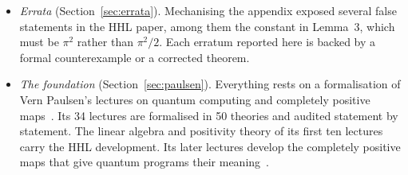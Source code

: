 \documentclass[runningheads]{llncs}
\let\ket\relax\let\bra\relax\let\braket\relax\let\ketbra\relax
\newcommand{\ket}[1]{|#1\rangle}
\newcommand{\bra}[1]{\langle #1|}
\newcommand{\braket}[2]{\langle #1|#2\rangle}
\newcommand{\ketbra}[2]{|#1\rangle\langle #2|}
\begin{document}
\begin{itemize}
transform; the controlled rotation, as a uniformly controlled rotation with Walsh--Hadamard angles; the
preparation of the clock and of an arbitrary $\ket b$; and, for $s$-sparse $A$, a Trotter circuit for
$e^{iAt}$ obtained from a graph colouring, with error $8(sLt)^2/r$ after $r(6s-2)$ queries. Suzuki's
higher-order product formulas are verified with error of order $|t|^{2k+3}/r^{2k+2}$.
\item \emph{Errata} (Section~\ref{sec:errata}). Mechanising the appendix exposed several false
statements in the HHL paper, among them the constant in Lemma~3, which must be $\pi^2$ rather than
$\pi^2/2$. Each erratum reported here is backed by a formal counterexample or a corrected theorem.
\item \emph{The foundation} (Section~\ref{sec:paulsen}). Everything rests on a formalisation of Vern
Paulsen's lectures on quantum computing and completely positive maps~\cite{paulsen2011notes}. Its 34
lectures are formalised in 50 theories and audited statement by
statement. The linear algebra and positivity theory of its first ten lectures carry the HHL
development. Its later lectures develop the completely positive maps that give quantum programs their
meaning~\cite{ying2016book}.
\end{itemize}
\end{document}
